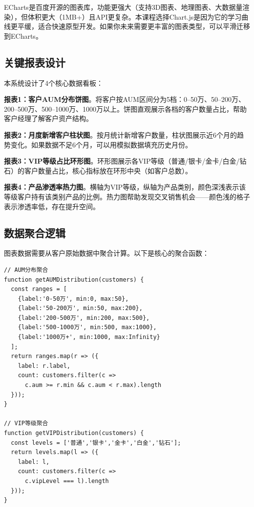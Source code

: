 \begin{notebox}
ECharts是百度开源的图表库，功能更强大（支持3D图表、地理图表、大数据量渲染），但体积更大（1MB+）且API更复杂。本课程选择Chart.js是因为它的学习曲线更平缓，适合快速原型开发。如果你未来需要更丰富的图表类型，可以平滑迁移到ECharts。
\end{notebox}

\subsection{关键报表设计}

本系统设计了4个核心数据看板：

\textbf{报表1：客户AUM分布饼图}。将客户按AUM区间分为5档：0--50万、50--200万、200--500万、500--1000万、1000万以上。饼图直观展示各档的客户数量占比，帮助客户经理了解客户资产结构。

\textbf{报表2：月度新增客户柱状图}。按月统计新增客户数量，柱状图展示近6个月的趋势变化。如果数据不足6个月，可以用模拟数据填充历史月份。

\textbf{报表3：VIP等级占比环形图}。环形图展示各VIP等级（普通/银卡/金卡/白金/钻石）的客户数量占比，核心指标放在环形中央（如客户总数）。

\textbf{报表4：产品渗透率热力图}。横轴为VIP等级，纵轴为产品类别，颜色深浅表示该等级客户持有该类别产品的比例。热力图帮助发现交叉销售机会——颜色浅的格子表示渗透率低，存在提升空间。

\subsection{数据聚合逻辑}

图表数据需要从客户原始数据中聚合计算。以下是核心的聚合函数：

\begin{lstlisting}[style=javascript]
// AUM分布聚合
function getAUMDistribution(customers) {
  const ranges = [
    {label:'0-50万', min:0, max:50},
    {label:'50-200万', min:50, max:200},
    {label:'200-500万', min:200, max:500},
    {label:'500-1000万', min:500, max:1000},
    {label:'1000万+', min:1000, max:Infinity}
  ];
  return ranges.map(r => ({
    label: r.label,
    count: customers.filter(c =>
      c.aum >= r.min && c.aum < r.max).length
  }));
}

// VIP等级聚合
function getVIPDistribution(customers) {
  const levels = ['普通','银卡','金卡','白金','钻石'];
  return levels.map(l => ({
    label: l,
    count: customers.filter(c =>
      c.vipLevel === l).length
  }));
}
\end{lstlisting}

